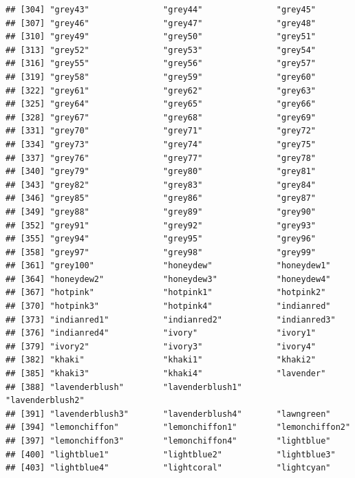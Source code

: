\documentclass[]{book}
\begin{document}
\begin{verbatim}
## [304] "grey43"               "grey44"               "grey45"              
## [307] "grey46"               "grey47"               "grey48"              
## [310] "grey49"               "grey50"               "grey51"              
## [313] "grey52"               "grey53"               "grey54"              
## [316] "grey55"               "grey56"               "grey57"              
## [319] "grey58"               "grey59"               "grey60"              
## [322] "grey61"               "grey62"               "grey63"              
## [325] "grey64"               "grey65"               "grey66"              
## [328] "grey67"               "grey68"               "grey69"              
## [331] "grey70"               "grey71"               "grey72"              
## [334] "grey73"               "grey74"               "grey75"              
## [337] "grey76"               "grey77"               "grey78"              
## [340] "grey79"               "grey80"               "grey81"              
## [343] "grey82"               "grey83"               "grey84"              
## [346] "grey85"               "grey86"               "grey87"              
## [349] "grey88"               "grey89"               "grey90"              
## [352] "grey91"               "grey92"               "grey93"              
## [355] "grey94"               "grey95"               "grey96"              
## [358] "grey97"               "grey98"               "grey99"              
## [361] "grey100"              "honeydew"             "honeydew1"           
## [364] "honeydew2"            "honeydew3"            "honeydew4"           
## [367] "hotpink"              "hotpink1"             "hotpink2"            
## [370] "hotpink3"             "hotpink4"             "indianred"           
## [373] "indianred1"           "indianred2"           "indianred3"          
## [376] "indianred4"           "ivory"                "ivory1"              
## [379] "ivory2"               "ivory3"               "ivory4"              
## [382] "khaki"                "khaki1"               "khaki2"              
## [385] "khaki3"               "khaki4"               "lavender"            
## [388] "lavenderblush"        "lavenderblush1"       "lavenderblush2"      
## [391] "lavenderblush3"       "lavenderblush4"       "lawngreen"           
## [394] "lemonchiffon"         "lemonchiffon1"        "lemonchiffon2"       
## [397] "lemonchiffon3"        "lemonchiffon4"        "lightblue"           
## [400] "lightblue1"           "lightblue2"           "lightblue3"          
## [403] "lightblue4"           "lightcoral"           "lightcyan"           

\end{verbatim}
\end{document}
